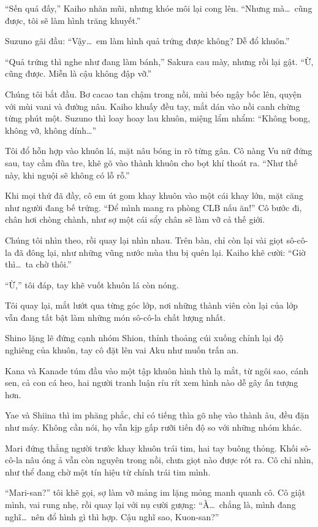\documentclass[../main.tex]{subfiles}
\begin{document}
``Sến quá đấy,'' Kaiho nhăn mũi, nhưng khóe môi lại cong lên. ``Nhưng mà\dots\ cũng được, tôi sẽ làm hình trăng khuyết.''

Suzuno gãi đầu: ``Vậy\dots\ em làm hình quả trứng được không? Dễ đổ khuôn.''

``Quả trứng thì nghe như đang làm bánh,'' Sakura cau mày, nhưng rồi lại gật. ``Ừ, cũng được. Miễn là cậu không đập vỡ.''

Chúng tôi bắt đầu. Bơ cacao tan chậm trong nồi, mùi béo ngậy bốc lên, quyện với mùi vani và đường nâu. Kaiho khuấy đều tay, mắt dán vào nồi canh chừng từng phút một. Suzuno thì loay hoay lau khuôn, miệng lẩm nhẩm: ``Không bong, không vỡ, không dính\dots''

Tôi đổ hỗn hợp vào khuôn lá, mặt nâu bóng in rõ từng gân. Cô nàng Vu nữ đứng sau, tay cầm đũa tre, khẽ gõ vào thành khuôn cho bọt khí thoát ra. ``Như thế này, khi nguội sẽ không có lỗ rỗ.''

Khi mọi thứ đã đầy, cô em út gom khay khuôn vào một cái khay lớn, mặt căng như người đang bế trứng. ``Để mình mang ra phòng CLB nấu ăn!'' Cô bước đi, chân hơi chòng chành, như sợ một cái sẩy chân sẽ làm vỡ cả thế giới.

Chúng tôi nhìn theo, rồi quay lại nhìn nhau. Trên bàn, chỉ còn lại vài giọt sô-cô-la đã đông lại, như những vũng nước mùa thu bị quên lại. Kaiho khẽ cười: ``Giờ thì\dots\ ta chờ thôi.''

``Ừ,'' tôi đáp, tay khẽ vuốt khuôn lá còn nóng.

Tôi quay lại, mắt lướt qua từng góc lớp, nơi những thành viên còn lại của lớp vẫn đang tất bật làm những món sô-cô-la chất lượng nhất.

Shino lặng lẽ đứng cạnh nhóm Shion, thỉnh thoảng cúi xuống chỉnh lại độ nghiêng của khuôn, tay cô đặt lên vai Aku như muốn trấn an.

Kana và Kanade túm đầu vào một tập khuôn hình thù lạ mắt, từ ngôi sao, cánh sen, cả con cá heo, hai người tranh luận ríu rít xem hình nào dễ gây ấn tượng hơn.

Yae và Shiina thì im phăng phắc, chỉ có tiếng thìa gõ nhẹ vào thành âu, đều đặn như máy. Không cần nói, họ vẫn kịp gấp rưỡi tiến độ so với những nhóm khác.

Mari đứng thẳng người trước khay khuôn trái tim, hai tay buông thỏng. Khối sô-cô-la nâu óng ả vẫn còn nguyên trong nồi, chưa giọt nào được rót ra. Cô chỉ nhìn, như thể đang chờ một tín hiệu từ chính trái tim mình.

``Mari-san?'' tôi khẽ gọi, sợ làm vỡ mảng im lặng mỏng manh quanh cô. Cô giật mình, vai rung nhẹ, rồi quay lại với nụ cười gượng: ``À\dots\ chẳng là, mình đang nghĩ\dots\ nên đổ hình gì thì hợp. Cậu nghĩ sao, Kuon-san?''
\end{document}
